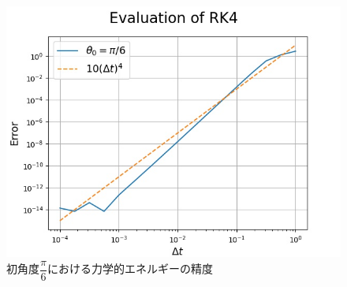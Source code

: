 \documentclass[a4paper,11pt]{jsarticle}
\begin{document}
\begin{figure}[H]
  \begin{center}
    \includegraphics[scale=0.8]{figure/RK41/evaluation1/pi6_2021-2-9-222927.jpeg}
    \caption{初角度\(\dfrac{\pi}{6}における力学的エネルギーの精度\)}
    \label{fig:RK41_eval1_4}
  \end{center}
\end{figure}
\newpage
\end{document}
